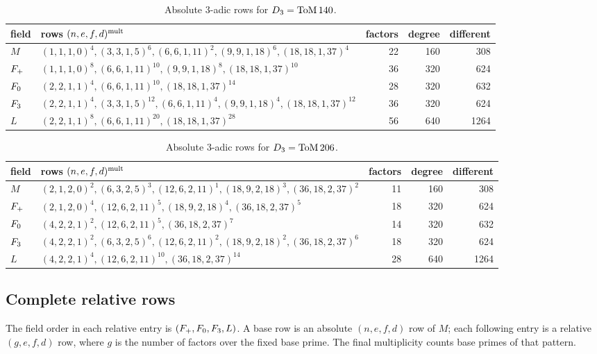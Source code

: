 \begin{table}[htbp]
\centering
\caption{Absolute $3$-adic rows for $D_3=\mathrm{ToM}\,140$.}
\label{tab:tom140-absolute}
\scriptsize
\begin{tabularx}{\textwidth}{@{}lXrrr@{}}
\toprule
field & rows $(n,e,f,d)^{\rm mult}$ & factors & degree & different\\
\midrule
$M$ & $(1,1,1,0)^4,(3,3,1,5)^6,(6,6,1,11)^2,(9,9,1,18)^6,(18,18,1,37)^4$ &22&160&308\\
$F_{+}$ & $(1,1,1,0)^8,(6,6,1,11)^{10},(9,9,1,18)^8,(18,18,1,37)^{10}$ &36&320&624\\
$F_{0}$ & $(2,2,1,1)^4,(6,6,1,11)^{10},(18,18,1,37)^{14}$ &28&320&632\\
$F_{3}$ & $(2,2,1,1)^4,(3,3,1,5)^{12},(6,6,1,11)^4,(9,9,1,18)^4,(18,18,1,37)^{12}$ &36&320&624\\
$L$ & $(2,2,1,1)^8,(6,6,1,11)^{20},(18,18,1,37)^{28}$ &56&640&1264\\
\bottomrule
\end{tabularx}
\end{table}

\begin{table}[htbp]
\centering
\caption{Absolute $3$-adic rows for $D_3=\mathrm{ToM}\,206$.}
\label{tab:tom206-absolute}
\scriptsize
\begin{tabularx}{\textwidth}{@{}lXrrr@{}}
\toprule
field & rows $(n,e,f,d)^{\rm mult}$ & factors & degree & different\\
\midrule
$M$ & $(2,1,2,0)^2,(6,3,2,5)^3,(12,6,2,11)^1,(18,9,2,18)^3,(36,18,2,37)^2$ &11&160&308\\
$F_{+}$ & $(2,1,2,0)^4,(12,6,2,11)^5,(18,9,2,18)^4,(36,18,2,37)^5$ &18&320&624\\
$F_{0}$ & $(4,2,2,1)^2,(12,6,2,11)^5,(36,18,2,37)^7$ &14&320&632\\
$F_{3}$ & $(4,2,2,1)^2,(6,3,2,5)^6,(12,6,2,11)^2,(18,9,2,18)^2,(36,18,2,37)^6$ &18&320&624\\
$L$ & $(4,2,2,1)^4,(12,6,2,11)^{10},(36,18,2,37)^{14}$ &28&640&1264\\
\bottomrule
\end{tabularx}
\end{table}

\subsection{Complete relative rows}

The field order in each relative entry is
$(F_{+},F_{0},F_{3},L)$.  A base row is an absolute
$(n,e,f,d)$ row of $M$; each following entry is a relative $(g,e,f,d)$ row,
where $g$ is the number of factors over the fixed base prime.  The final
multiplicity counts base primes of that pattern.

